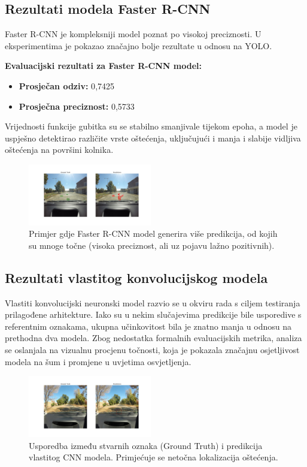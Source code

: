 \documentclass[conference]{IEEEtran}
\begin{document}
\subsection{Rezultati modela Faster R-CNN}

Faster R-CNN je kompleksniji model poznat po visokoj preciznosti. U eksperimentima je pokazao značajno bolje rezultate u odnosu na YOLO.

\textbf{Evaluacijski rezultati za Faster R-CNN model:}
\begin{itemize}
  \item \textbf{Prosječan odziv:} 0{,}7425
  \item \textbf{Prosječna preciznost:} 0{,}5733
\end{itemize}

Vrijednosti funkcije gubitka su se stabilno smanjivale tijekom epoha, a model je uspješno detektirao različite vrste oštećenja, uključujući i manja i slabije vidljiva oštećenja na površini kolnika.

\begin{figure}[htbp]
\centerline{\includegraphics[width=0.48\textwidth]{Images/FasterCNNPic.jpg}}
\caption{Primjer gdje Faster R-CNN model generira više predikcija, od kojih su mnoge točne (visoka preciznost, ali uz pojavu lažno pozitivnih).}
\label{fig:fasterrcnn_eval}
\end{figure}


\subsection{Rezultati vlastitog konvolucijskog modela}

Vlastiti konvolucijski neuronski model razvio se u okviru rada s ciljem testiranja prilagođene arhitekture. Iako su u nekim slučajevima predikcije bile usporedive s referentnim oznakama, ukupna učinkovitost bila je znatno manja u odnosu na prethodna dva modela.
Zbog nedostatka formalnih evaluacijskih metrika, analiza se oslanjala na vizualnu procjenu točnosti, koja je pokazala značajnu osjetljivost modela na šum i promjene u uvjetima osvjetljenja.

\begin{figure}[htbp]
\centerline{\includegraphics[width=0.48\textwidth]{Images/CustomCNNPic.jpg}}
\caption{Usporedba između stvarnih oznaka (Ground Truth) i predikcija vlastitog CNN modela. Primjećuje se netočna lokalizacija oštećenja.}
\label{fig:customcnn_eval}
\end{figure}
\end{document}
